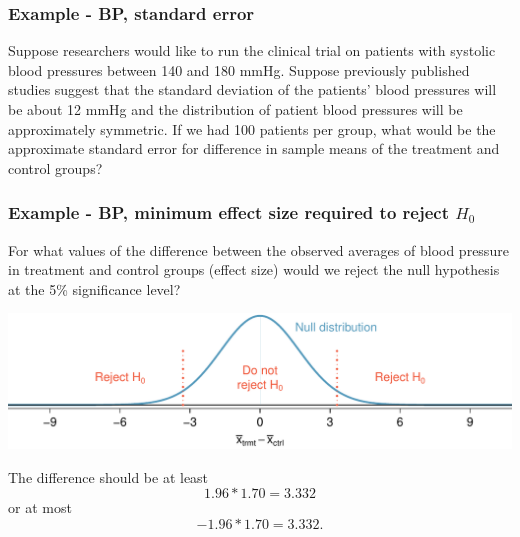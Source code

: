 \begin{frame}
\frametitle{Example - BP, standard error}

{\dq
{\footnotesize
Suppose researchers would like to run the clinical trial on patients with systolic blood pressures between 140 and 180 mmHg. Suppose previously published studies suggest that the standard deviation of the patients' blood pressures will be about 12 mmHg and the distribution of patient blood pressures will be approximately symmetric. If we had 100 patients per group, what would be the approximate standard error for difference in sample means of the treatment and control groups?
}
}

\pause

\soln{
\[ SE = \sqrt{ \frac{12^2}{100} + \frac{12^2}{100} } = 1.70 \]
}

\end{frame}


\begin{frame}
\frametitle{Example - BP, minimum effect size required to reject $H_0$}

{\dq
{\footnotesize
For what values of the difference between the observed averages of blood pressure in treatment and control groups (effect size) would we reject the null hypothesis at the 5\% significance level?}
}

\pause

\includegraphics[width=\textwidth]{5-4_power/figures/power/power_null_B_0_1-7_with_rejection_region}

\pause

The difference should be at least 
\[ 1.96 * 1.70 = 3.332 \] 
or at most 
\[ -1.96 * 1.70 = 3.332. \]

\end{frame}



